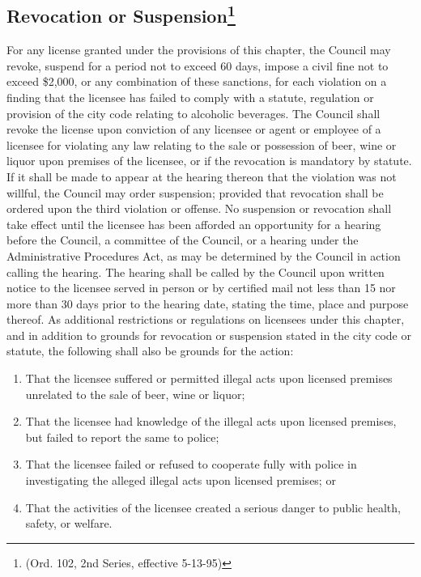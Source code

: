 \subsection{Revocation or Suspension\footnote{(Ord. 102, 2nd Series, effective 5-13-95)}}
For any license granted under the provisions of this chapter, the Council may revoke, suspend for a period not to exceed 60 days, impose a civil fine not to exceed \$2,000, or any combination of these sanctions, for each violation on a finding that the licensee has failed to comply with a statute, regulation or provision of the city code relating to alcoholic beverages. The Council shall revoke the license upon conviction of any licensee or agent or employee of a licensee for violating any law relating to the sale or possession of beer, wine or liquor upon premises of the licensee, or if the revocation is mandatory by statute. If it shall be made to appear at the hearing thereon that the violation was not willful, the Council may order suspension; provided that revocation shall be ordered upon the third violation or offense. No suspension or revocation shall take effect until the licensee has been afforded an opportunity for a hearing before the Council, a committee of the Council, or a hearing under the Administrative Procedures Act, as may be determined by the Council in action calling the hearing. The hearing shall be called by the Council upon written notice to the licensee served in person or by certified mail not less than 15 nor more than 30 days prior to the hearing date, stating the time, place and purpose thereof. As additional restrictions or regulations on licensees under this chapter, and in addition to grounds for revocation or suspension stated in the city code or statute, the following shall also be grounds for the action:
\begin{enumerate}[{\indent}1)]
    \item That the licensee suffered or permitted illegal acts upon licensed premises unrelated to the sale of beer, wine or liquor; 
    \item That the licensee had knowledge of the illegal acts upon licensed premises, but failed to report the same to police; 
    \item That the licensee failed or refused to cooperate fully with police in investigating the alleged illegal acts upon licensed premises; or
    \item That the activities of the licensee created a serious danger to public health, safety, or welfare.
\end{enumerate}
